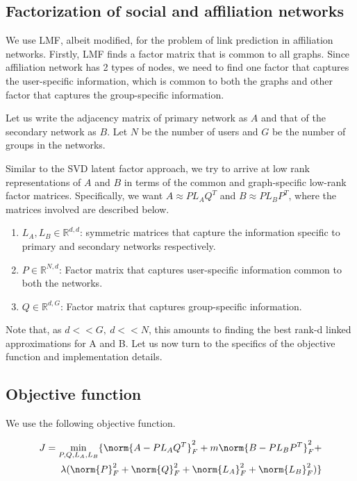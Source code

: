 \documentclass{report}
\begin{document}
\subsection{Factorization of social and affiliation networks}
We use LMF, albeit modified, for the problem of link prediction in affiliation networks. Firstly, LMF finds a factor matrix that is common to all graphs. Since affiliation network has 2 types of nodes, we need to find one factor that captures the user-specific information, which is common to both the graphs and other factor that captures the group-specific information.

Let us write the adjacency matrix of primary network as $A$ and that of the secondary network as $B$. Let $N$ be the number of users and $G$ be the number of groups in the networks.

Similar to the SVD latent factor approach, we try to arrive at low rank representations of $A$ and $B$ in terms of the common and graph-specific low-rank factor matrices. Specifically, we want $A \approx P L_A Q^T$ and $B \approx P L_B P^T$, where the matrices involved are described below.

\begin{enumerate}
 \item $L_A, L_B \in \mathbb{R}^{d,d}$: symmetric matrices that capture the information specific to primary and secondary networks respectively.
 \item $P \in \mathbb{R}^{N,d}$: Factor matrix that captures user-specific information common to both the networks.
 \item $Q \in \mathbb{R}^{d,G}$: Factor matrix that captures group-specific information.
\end{enumerate}

Note that, as $d << G,\ d<<N$, this amounts to finding the best rank-d linked approximations for A and B. Let us now turn to the specifics of the objective function and implementation details.

\subsection{Objective function}
We use the following objective function.

\begin{eqnarray*}
 J = \min_{P,Q,L_A,L_B} \{\norm{A - P L_A Q^{T}}_F^{2} + m\norm{B - P L_B P^{T}}_F^{2} +  \\
 \lambda(\norm{P}_F^{2} + \norm{Q}_F^{2} + \norm{L_A}_F^{2} + \norm{L_B}_F^{2})\}
\end{eqnarray*}
\end{document}
